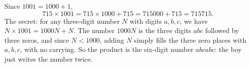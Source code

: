 Since $1001=1000+1$,
\[
715\times1001=715\times1000+715=715000+715=\boxed{715715}.
\]
The secret: for any three-digit number $N$ with digits $a,b,c$, we have $N\times1001=1000N+N$. The number $1000N$ is the three digits $abc$ followed by three zeros, and since $N<1000$, adding $N$ simply fills the three zero places with $a,b,c$, with no carrying. So the product is the six-digit number $abcabc$: the boy just writes the number twice.
